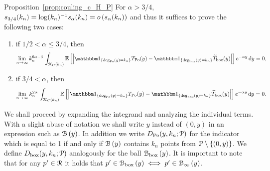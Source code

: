 \begin{proofof}{Proposition~\ref{prop:couling_c_H_P}}
For $\alpha > 3/4$, $s_{3/4}(k_n) = \log(k_n)^{-1} s_\alpha(k_n) = o\left(s_\alpha(k_n)\right)$ and thus it suffices to prove the following two cases:
\begin{enumerate}
\item if $1/2 < \alpha \leq 3/4$, then
\[
	\lim_{n\to \infty} k_n^{6\alpha - 3} \, \int_{\Kcal_{C}(k_n)} 
		\Exp{\left|\ind{\mathrm{deg}_{\Po}(y) = k_n} T_{\Po}(y)
		- \ind{\mathrm{deg}_{\mathrm{box}}(y) = k_n} \widetilde{T}_{\mathrm{box}}(y)\right|} e^{-\alpha y} \dd y = 0,
\]
\item if $3/4 < \alpha$, then
\[ 
	\lim_{n\to \infty} k_n^{2\alpha} \, \int_{\Kcal_{C}(k_n)} 
		\Exp{\left|\ind{\mathrm{deg}_{\Po}(y) = k_n} T_{\Po}(y)
		- \ind{\mathrm{deg}_{\mathrm{box}}(y) = k_n} \widetilde{T}_{\mathrm{box}}(y)\right|} e^{-\alpha y} \dd y = 0.
\]
\end{enumerate}
We shall proceed by expanding the integrand and analyzing the individual terms. With a slight abuse of notation we shall write $y$ instead of $(0,y)$ in an expression such as ${\mathcal B}\left(y\right)$. In addition we write $D_{{\mathrm{Po}}}(y,k_n;{\mathcal P})$ for the indicator which is equal to 1 if and only if ${\mathcal B}\left(y\right)$ contains $k_n$ points from ${\mathcal P} \setminus \{(0,y)\}$. We define $D_{\text{box}}(y,k_n;{\mathcal P})$ analogously for the ball ${\mathcal B}_{\text{box}}\left(y\right)$. It is important to note that for any $p^\prime \in {\mathcal R}$ it holds that $p^\prime \in {\mathcal B}_{\text{box}}\left(y\right) \iff p^\prime \in {\mathcal B}_{\infty}\left(y\right)$.





\end{proofof}
